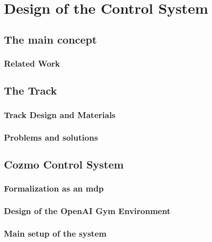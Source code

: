 \chapter{Design of the Control System}

\lipsum[10]

\section{The main concept}

\lipsum[10]

\subsection{Related Work}

\lipsum[10]

\section{The Track}

\lipsum[10]

\subsection{Track Design and Materials}

\lipsum[10]

\subsection{Problems and solutions}

\lipsum[10]

\section{Cozmo Control System}

\lipsum[10]

\subsection{Formalization as an \acrshort{mdp}}

\lipsum[10]

\subsection{Design of the OpenAI Gym Environment}

\lipsum[10]

\subsection{Main setup of the system}

\lipsum[10]